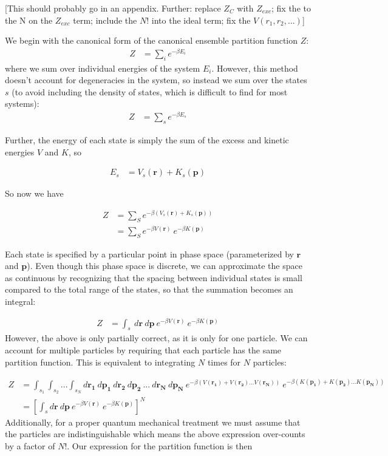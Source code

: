 \documentclass[12pt]{article}
\begin{document}
{\color{red} [This should probably go in an appendix. Further: replace $Z_C$ with $Z_{exc}$; fix the to the N on the $Z_{exc}$ term; include the $N!$ into the ideal term; fix the $V(r_1, r_2, ...)$]}

We begin with the canonical form of the canonical ensemble partition function $Z$:
\begin{align}
    Z &= \sum_i e^{-\beta E_i}
\end{align}
where we sum over individual energies of the system $E_i$. However, this method doesn't account for degeneracies in the system, so instead we sum over the states $s$ (to avoid including the density of states, which is difficult to find for most systems):
\begin{align}
    Z &= \sum_s e^{-\beta E_s}
\end{align} 

Further, the energy of each state is simply the sum of the excess and kinetic energies $V$ and $K$, so

\begin{align}
    E_s &= V_s(\mathbf{r}) + K_s(\mathbf{p})
\end{align}

So now we have 

\begin{align}
    Z &= \sum_S e^{-\beta (V_s(\mathbf{r}) + K_s(\mathbf{p}))}\\
    &= \sum_S e^{-\beta V(\mathbf{r})}~e^{-\beta K(\mathbf{p})}
\end{align} 

Each state is specified by a particular point in phase space (parameterized by $\mathbf{r}$ and $\mathbf{p}$). Even though this phase space is discrete, we can approximate the space as continuous by recognizing that the {\color{red}spacing between individual states is small compared to the total range of the states}, so that the summation becomes an integral:

\begin{align}
    Z &= \int_s~ d\mathbf{r}~ d\mathbf{p} ~e^{-\beta V(\mathbf{r})}~e^{-\beta K(\mathbf{p})}
\end{align} 
However, the above is only partially correct, as it is only for one particle. We can account for multiple particles by requiring that each particle has the same partition function. This is equivalent to integrating $N$ times for $N$ particles:

\begin{align}
    Z &= \int_{s_1} \int_{s_2} ... \int_{s_N} d\mathbf{r_1}~ d\mathbf{p_1} ~d\mathbf{r_2} ~d\mathbf{p_2} ~... ~d\mathbf{r_N}~ d\mathbf{p_N} ~e^{-\beta(V(\mathbf{r_1}) + V(\mathbf{r_2}) ... V(\mathbf{r_N}))}~e^{-\beta(K(\mathbf{p_1}) + K(\mathbf{p_2}) ... K(\mathbf{p_N}))}\\
    &= \left[\int_s d\mathbf{r} ~ d\mathbf{p} ~e^{-\beta V(\mathbf{r})}~e^{-\beta K(\mathbf{p})}\right]^{N}
\end{align}
Additionally, for a proper quantum mechanical treatment we must assume that the particles are indistinguishable which means the above expression over-counts by a factor of $N!$. Our expression for the partition function is then
\end{document}
